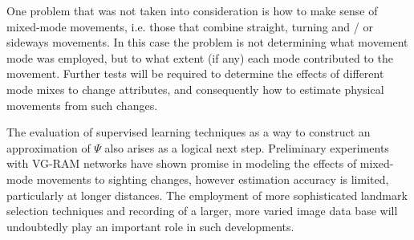 \documentclass[twocolumn, 9pt]{jsproceedings}
\begin{document}
One problem that was not taken into consideration is how to make sense of mixed-mode movements, i.e. those that combine straight, turning and / or sideways movements. In this case the problem is not determining what movement mode was employed, but to what extent (if any) each mode contributed to the movement. Further tests will be required to determine the effects of different mode mixes to change attributes, and consequently how to estimate physical movements from such changes.

The evaluation of supervised learning techniques as a way to construct an approximation of \(\Psi\) also arises as a logical next step. Preliminary experiments with VG-RAM networks have shown promise in modeling the effects of mixed-mode movements to sighting changes, however estimation accuracy is limited, particularly at longer distances. The employment of more sophisticated landmark selection techniques and recording of a larger, more varied image data base will undoubtedly play an important role in such developments.

\footnotesize




\normalsize
\end{document}
